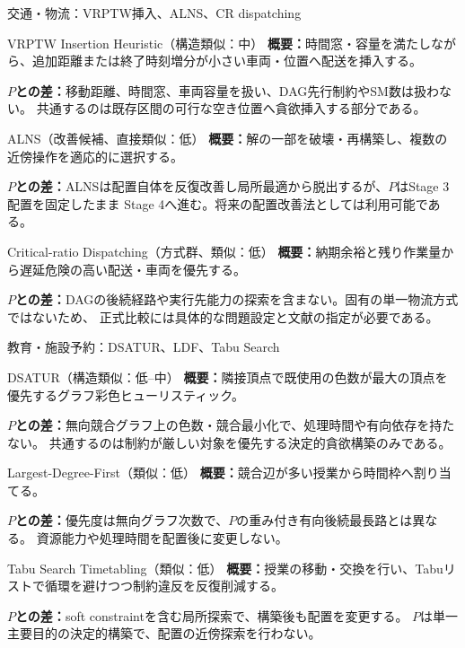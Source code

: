 \documentclass[aspectratio=169,10pt]{beamer}
\begin{document}
\begin{frame}{交通・物流：VRPTW挿入、ALNS、CR dispatching}
  \scriptsize
  \begin{block}{VRPTW Insertion Heuristic（構造類似：中）}
    \textbf{概要：}時間窓・容量を満たしながら、追加距離または終了時刻増分が小さい車両・位置へ配送を挿入する。\par
    \textbf{$P$との差：}移動距離、時間窓、車両容量を扱い、DAG先行制約やSM数は扱わない。
    共通するのは既存区間の可行な空き位置へ貪欲挿入する部分である。
  \end{block}
  \begin{block}{ALNS（改善候補、直接類似：低）}
    \textbf{概要：}解の一部を破壊・再構築し、複数の近傍操作を適応的に選択する。\par
    \textbf{$P$との差：}ALNSは配置自体を反復改善し局所最適から脱出するが、$P$はStage 3配置を固定したまま
    Stage 4へ進む。将来の配置改善法としては利用可能である。
  \end{block}
  \begin{block}{Critical-ratio Dispatching（方式群、類似：低）}
    \textbf{概要：}納期余裕と残り作業量から遅延危険の高い配送・車両を優先する。\par
    \textbf{$P$との差：}DAGの後続経路や実行先能力の探索を含まない。固有の単一物流方式ではないため、
    正式比較には具体的な問題設定と文献の指定が必要である。
  \end{block}
\end{frame}

\begin{frame}{教育・施設予約：DSATUR、LDF、Tabu Search}
  \scriptsize
  \begin{block}{DSATUR（構造類似：低--中）}
    \textbf{概要：}隣接頂点で既使用の色数が最大の頂点を優先するグラフ彩色ヒューリスティック。\par
    \textbf{$P$との差：}無向競合グラフ上の色数・競合最小化で、処理時間や有向依存を持たない。
    共通するのは制約が厳しい対象を優先する決定的貪欲構築のみである。
  \end{block}
  \begin{block}{Largest-Degree-First（類似：低）}
    \textbf{概要：}競合辺が多い授業から時間枠へ割り当てる。\par
    \textbf{$P$との差：}優先度は無向グラフ次数で、$P$の重み付き有向後続最長路とは異なる。
    資源能力や処理時間を配置後に変更しない。
  \end{block}
  \begin{block}{Tabu Search Timetabling（類似：低）}
    \textbf{概要：}授業の移動・交換を行い、Tabuリストで循環を避けつつ制約違反を反復削減する。\par
    \textbf{$P$との差：}soft constraintを含む局所探索で、構築後も配置を変更する。
    $P$は単一主要目的の決定的構築で、配置の近傍探索を行わない。
  \end{block}
\end{frame}
\end{document}
